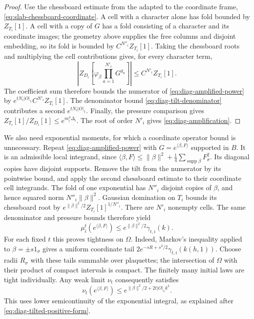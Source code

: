 \documentclass[11pt,letterpaper,reqno]{amsart}
\DeclareMathOperator{\supp}{supp}
\begin{document}
\begin{proof}
Use the chessboard estimate from the adapted to the coordinate
frame, \eqref{eq:slab-chessboard-coordinate}. A cell with a
character alone has fold bounded by $Z_{T_i}[1]$. A cell with
a copy of $G$ has a fold consisting of a character and its
coordinate images; the geometry above supplies the free columns
and disjoint embedding, so its fold is bounded by
$C^{N''_i}Z_{T_i}[1]$. Taking the chessboard roots and multiplying
the cell contributions gives, for every character term,
\[
 \left|Z_{D_i}\left[\varphi_\beta
                    \prod_{a=1}^{N'_i}G^{g_a}\right]\right|
                \le C^{N'_i}Z_{T_i}[1].
\]
The coefficient sum therefore bounds the numerator of
\eqref{eq:diag-amplified-power} by
$e^{tN_i|O|_1}C^{N'_i}Z_{T_i}[1]$. The denominator bound
\eqref{eq:diag-tilt-denominator} contributes a second
$e^{tN_i|O|_1}$. Finally, the pressure comparison gives
$Z_{T_i}[1]/Z_{D_i}[1]\le e^{m_i^3\Delta_i}$.
The root of order $N'_i$ gives
\eqref{eq:diag-amplification}.
\end{proof}

We also need exponential moments, for which a coordinate operator
bound is unnecessary. Repeat \eqref{eq:diag-amplified-power} with
$G=e^{\langle\beta,F\rangle}$ supported in $B$. It is an admissible
local integrand, since
$\langle\beta,F\rangle\le\|\beta\|^2+
\frac14\sum_{\supp\beta}F_\sigma^2$. Its diagonal copies have
disjoint supports. Remove the tilt from the numerator by its
pointwise bound, and apply the second chessboard estimate to
their coordinate cell integrands. The fold of one exponential
has $N''_i$ disjoint copies of $\beta$, and hence squared norm
$N''_i\|\beta\|^2$. Gaussian domination on $T_i$ bounds its
chessboard root by
$e^{\|\beta\|^2/2}Z_{T_i}[1]^{1/N''_i}$. There are $N'_i$
nonempty cells. The same denominator and pressure bounds
therefore yield
\begin{equation}\label{eq:diag-tilted-domination}
 \mu_i^t(e^{\langle\beta,F\rangle})
      \le e^{\|\beta\|^2/2}\gamma_{t,i}(k).
\end{equation}
For each fixed $t$ this proves tightness on $\Omega$. Indeed,
Markov's inequality applied to $\beta=\pm s1_\sigma$ gives a
uniform coordinate tail $2e^{-sR+s^2/2}\gamma_{t,i}(k(h,1))$.
Choose radii $R_\sigma$ with these tails summable over plaquettes;
the intersection of $\Omega$ with their product of compact
intervals is compact. The finitely many initial laws are tight
individually. Any weak limit $\nu_t$ consequently satisfies
\begin{equation}\label{eq:diag-limit-domination}
 \nu_t(e^{\langle\beta,F\rangle})
      \le e^{\|\beta\|^2/2+2t|O|_1k^3}.
\end{equation}
This uses lower semicontinuity of the exponential integral,
as explained after \eqref{eq:diag-tilted-positive-form}.
\end{document}

